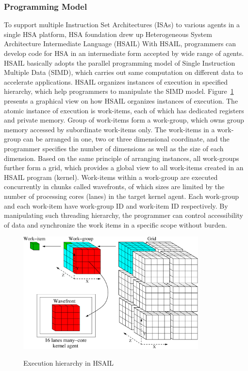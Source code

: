 \documentclass[12pt]{article}
\begin{document}
\begin{CJK}{UTF8}{bkai}
        \subsubsection{Programming Model}
        To support multiple Instruction Set Architectures (ISAs) to various agents in a single HSA platform,
        HSA foundation drew up Heterogeneous System Architecture Intermediate Language (HSAIL)
        With HSAIL, programmers can develop code for HSA in an intermediate form accepted by wide range of agents.
        HSAIL basically adopts the parallel programming model of Single Instruction Multiple Data (SIMD), 
        which carries out same computation on different data to accelerate applications.
        HSAIL organizes instances of execution in specified hierarchy, which help programmers to manipulate the SIMD model.
        Figure~\ref{fig:grid} presents a graphical view on how HSAIL organizes instances of execution.
        The atomic instance of execution is work-items, each of which has dedicated registers and private memory.
        Group of work-items form a work-group, which owns group memory accessed by subordinate work-items only.
        The work-items in a work-group can be arranged in one, two or three dimensional coordinate, 
        and the programmer specifies the number of dimensions as well as the size of each dimension.
        Based on the same principle of arranging instances, all work-groups further form a grid, 
        which provides a global view to all work-items created in an HSAIL program (kernel).
        Work-items within a work-group are executed concurrently in chunks called wavefronts, 
        of which sizes are limited by the number of processing cores (lanes) in the target kernel agent.
        Each work-group and each work-item have work-group ID and work-item ID respectively.
        By manipulating such threading hierarchy, 
        the programmer can control accessibility of data and synchronize the work items in a specific scope without burden.
        \begin{figure}[!ht] 
            \caption{Execution hierarchy in HSAIL}
            \centering
            \includegraphics[width=0.85\textwidth]{./figs/grid.eps}
            \label{fig:grid}
        \end{figure}

\end{CJK}
\end{document}
